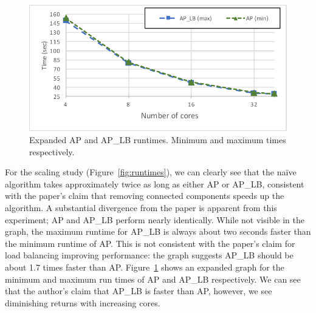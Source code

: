 \documentclass[11pt]{elsarticle}
\begin{document}
\begin{figure}[htp]
\centering
\includegraphics[width=.9\textwidth]{zoomedapaplb2}
\caption{Expanded AP and AP\_LB runtimes. Minimum and maximum times respectively.}
\label{fig:expruntimes}
\end{figure}
For the scaling study (Figure~\ref{fig:runtimes}), we can clearly see that the na{\"i}ve algorithm takes approximately twice as long as either AP or AP\_LB, consistent with the paper's claim that removing connected components speeds up the algorithm. A substantial divergence from the paper is apparent from this experiment; AP and AP\_LB perform nearly identically. While not visible in the graph, the maximum runtime for AP\_LB is always about two seconds faster than the minimum runtime of AP. This is not consistent with the paper's claim for load balancing improving performance: the graph suggests AP\_LB should be about 1.7 times faster than AP. Figure~\ref{fig:expruntimes} shows an expanded graph for the minimum and maximum run times of AP and AP\_LB respectively. We can see that the author's claim that AP\_LB is faster than AP, however, we see diminishing returns with increasing cores.
\end{document}
